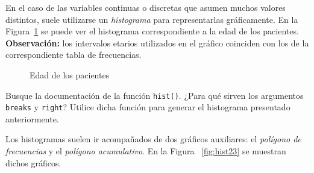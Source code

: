 \documentclass{../prob}
\begin{document}
	\begin{problema}
	En el caso de las variables continuas o discretas que asumen muchos valores distintos, suele utilizarse un \textit{histograma} para representarlas gráficamente. En la Figura~\ref{fig:hist} se puede ver el histograma correspondiente a la edad de los pacientes. \\
	\textbf{Observación:} los intervalos etarios utilizados en el gráfico coinciden con los de la correspondiente tabla de frecuencias.
\begin{figure}[!ht]
    \centering
    
    \caption{Edad de los pacientes}
    \label{fig:hist}
\end{figure}		
	
	\begin{parte}
	Busque la documentación de la función \texttt{hist()}. ¿Para qué sirven los argumentos \texttt{breaks} y \texttt{right}? Utilice dicha función para generar el histograma presentado anteriormente.\\
	
	\noindent{}
	\end{parte}	
	
	\begin{parte}
	Los histogramas suelen ir acompañados de dos gráficos auxiliares: el \textit{polígono de frecuencias} y el \textit{polígono acumulativo}. En la Figura ~\ref{fig:hist23} se muestran dichos gráficos.


\end{parte}
\end{problema}
\end{document}
